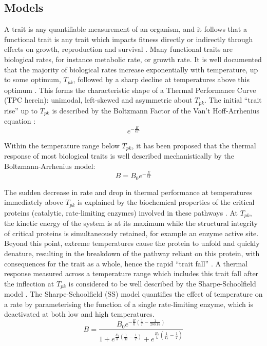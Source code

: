 \documentclass[11pt]{article}
\begin{document}
        \subsection{Models}
        A trait is any quantifiable measurement of an organism, and it follows that a functional trait is any trait which impacts fitness directly or indirectly through effects on growth, reproduction and survival . Many functional traits are biological rates, for instance metabolic rate, or growth rate. It is well documented that the majority of biological rates increase exponentially with temperature, up to some optimum, $T_{pk}$, followed by a sharp decline at temperatures above this optimum . This forms the characteristic shape of a Thermal Performance Curve (TPC herein): unimodal, left-skewed and asymmetric about $T_{pk}$. The initial ``trait rise''  up to $T_{pk}$  is described by the Boltzmann Factor of the Van't Hoff-Arrhenius equation :
        \begin{equation}
            e^{-\frac{E}{kT}}
        \end{equation}

        Within the temperature range below $T_{pk}$, it has been proposed that the thermal response of most biological traits is well described mechanistically by the Boltzmann-Arrhenius model:
        \begin{equation}
            B = B_0e^{-\frac{E}{kT}}
        \end{equation}

        The sudden decrease in rate and drop in thermal performance at temperatures immediately above $T_{pk}$ is explained by the biochemical properties of the critical proteins (catalytic, rate-limiting enzymes) involved in these pathways . At $T_{pk}$, the kinetic energy of the system is at its maximum while the structural integrity of critical proteins is simultaneously retained, for example an enzyme active site. Beyond this point, extreme temperatures cause the protein to unfold and quickly denature, resulting in the breakdown of the pathway reliant on this protein, with consequences for the trait as a whole, hence the rapid ``trait fall'' \cite{dell2011systematic, brown2004toward}. 
        A thermal response measured across a temperature range which includes this trait fall after the inflection at $T_{pk}$ is considered to be well described by the Sharpe-Schoolfield model \cite{schoolfield1981non}. The Sharpe-Schoolfield (SS) model quantifies the effect of temperature on a rate by parameterising the function of a single rate-limiting enzyme, which is deactivated at both low and high temperatures. 
        \begin{equation}
            B = \frac{B_{0}e^{-\frac{E}{k}(\frac{1}{T}-\frac{1}{283.15})}}{1 + e^{\frac{E_l}{k}(\frac{1}{Tl}-\frac{1}{T})} + e^{\frac{E_h}{k}(\frac{1}{T_h}-\frac{1}{T})}}
        \end{equation}
        
\end{document}
